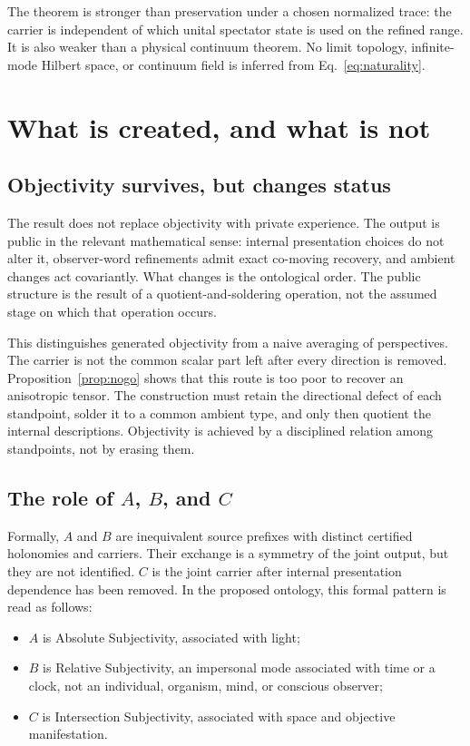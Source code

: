 The theorem is stronger than preservation under a chosen normalized trace: the carrier is independent of which unital spectator state is used on the refined range. It is also weaker than a physical continuum theorem. No limit topology, infinite-mode Hilbert space, or continuum field is inferred from Eq.~\eqref{eq:naturality}.

\section{What is created, and what is not}

\subsection{Objectivity survives, but changes status}

The result does not replace objectivity with private experience. The output is public in the relevant mathematical sense: internal presentation choices do not alter it, observer-word refinements admit exact co-moving recovery, and ambient changes act covariantly. What changes is the ontological order. The public structure is the result of a quotient-and-soldering operation, not the assumed stage on which that operation occurs.

This distinguishes generated objectivity from a naive averaging of perspectives. The carrier is not the common scalar part left after every direction is removed. Proposition~\ref{prop:nogo} shows that this route is too poor to recover an anisotropic tensor. The construction must retain the directional defect of each standpoint, solder it to a common ambient type, and only then quotient the internal descriptions. Objectivity is achieved by a disciplined relation among standpoints, not by erasing them.

\subsection{The role of \texorpdfstring{$A$, $B$, and $C$}{A, B, and C}}

Formally, $A$ and $B$ are inequivalent source prefixes with distinct certified holonomies and carriers. Their exchange is a symmetry of the joint output, but they are not identified. $C$ is the joint carrier after internal presentation dependence has been removed. In the proposed ontology, this formal pattern is read as follows:
\begin{itemize}
\item $A$ is Absolute Subjectivity, associated with light;
\item $B$ is Relative Subjectivity, an impersonal mode associated with time or a clock, not an individual, organism, mind, or conscious observer;
\item $C$ is Intersection Subjectivity, associated with space and objective manifestation.
\end{itemize}

